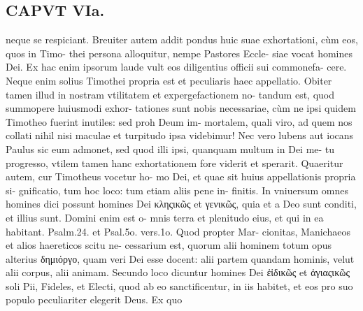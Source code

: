 \documentclass{article}
\begin{document}
\begin{pages}
\section*{CAPVT VIa. }
\marginpar{[ p.459 ]}\pstart neque  se respiciant. Breuiter autem addit pondus huic suae exhortationi, cùm eos, quos in Timo- thei persona alloquitur, nempe Pastores Eccle- siae vocat homines Dei. Ex hac enim ipsorum laude vult eos diligentius officii sui commonefa- cere. Neque enim solius Timothei propria est et peculiaris haec appellatio. Obiter tamen illud in nostram vtilitatem et expergefactionem no- tandum est, quod summopere huiusmodi exhor- tationes sunt nobis necessariae, cùm ne ipsi quidem Timotheo fuerint inutiles: sed proh Deum im- mortalem, quali viro, ad quem nos collati nihil nisi maculae et turpitudo ipsa videbimur! Nec vero lubens aut iocans Paulus sic eum admonet, sed quod illi ipsi, quanquam multum in Dei me- tu progresso, vtilem tamen hanc exhortationem fore viderit et sperarit.  \pend\pstart Quaeritur autem, cur Timotheus vocetur ho- mo Dei, et quae sit huius appellationis propria si- gnificatio, tum hoc loco: tum etiam aliis pene in- finitis. In vniuersum omnes homines dici possunt homines Dei κληςικῶς et γενικῶς, quia et a Deo sunt conditi, et illius sunt. Domini enim est o- mnis terra et plenitudo eius, et qui in ea habitant. Psalm.24. et Psal.5o. vers.1o. Quod propter Mar- cionitas, Manichaeos et alios haereticos scitu ne- cessarium est, quorum alii hominem totum opus alterius δημιόργο, quam veri Dei esse docent: alii partem quandam hominis, velut alii corpus, alii animam. Secundo loco dicuntur homines Dei ἐἰδικῶς et ἀγιαςικῶς soli Pii, Fideles, et Electi, quod ab eo sanctificentur, in iis habitet, et eos pro suo populo peculiariter elegerit Deus. Ex quo  \pend

\end{pages}
\end{document}

